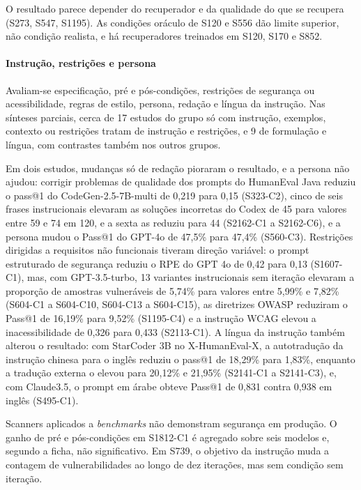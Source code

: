 O resultado parece depender do recuperador e da qualidade do que se recupera (S273, S547, S1195). As condições oráculo de S120 e S556 dão limite superior, não condição realista, e há recuperadores treinados em S120, S170 e S852.

\paragraph{Instrução, restrições e persona}
Avaliam-se especificação, pré e pós-condições, restrições de segurança ou acessibilidade, regras de estilo, persona, redação e língua da instrução. Nas sínteses parciais, cerca de 17 estudos do grupo só com instrução, exemplos, contexto ou restrições tratam de instrução e restrições, e 9 de formulação e língua, com contrastes também nos outros grupos.

Em dois estudos, mudanças só de redação pioraram o resultado, e a persona não ajudou: corrigir problemas de qualidade dos prompts do HumanEval Java reduziu o pass@1 do CodeGen-2.5-7B-multi de 0,219 para 0,15 (S323-C2), cinco de seis frases instrucionais elevaram as soluções incorretas do Codex de 45 para valores entre 59 e 74 em 120, e a sexta as reduziu para 44 (S2162-C1 a S2162-C6), e a persona mudou o Pass@1 do GPT-4o de 47,5\% para 47,4\% (S560-C3).
Restrições dirigidas a requisitos não funcionais tiveram direção variável: o prompt estruturado de segurança reduziu o RPE do GPT 4o de 0,42 para 0,13 (S1607-C1), mas, com GPT-3.5-turbo, 13 variantes instrucionais sem iteração elevaram a proporção de amostras vulneráveis de 5,74\% para valores entre 5,99\% e 7,82\% (S604-C1 a S604-C10, S604-C13 a S604-C15), as diretrizes OWASP reduziram o Pass@1 de 16,19\% para 9,52\% (S1195-C4) e a instrução WCAG elevou a inacessibilidade de 0,326 para 0,433 (S2113-C1).
A língua da instrução também alterou o resultado: com StarCoder 3B no X-HumanEval-X, a autotradução da instrução chinesa para o inglês reduziu o pass@1 de 18,29\% para 1,83\%, enquanto a tradução externa o elevou para 20,12\% e 21,95\% (S2141-C1 a S2141-C3), e, com Claude3.5, o prompt em árabe obteve Pass@1 de 0,831 contra 0,938 em inglês (S495-C1).

Scanners aplicados a \textit{benchmarks} não demonstram segurança em produção. O ganho de pré e pós-condições em S1812-C1 é agregado sobre seis modelos e, segundo a ficha, não significativo. Em S739, o objetivo da instrução muda a contagem de vulnerabilidades ao longo de dez iterações, mas sem condição sem iteração.

